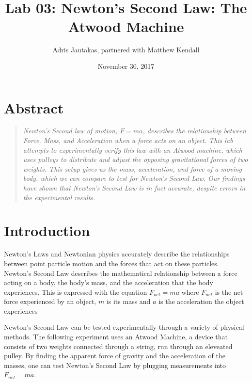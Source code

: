 \documentclass[12pt]{article}
\title{Lab 03: Newton's Second Law: The Atwood Machine}
\author{Adris Jautakas, partnered with Matthew Kendall}
\date{November 30, 2017}
\begin{document}
   \maketitle

    \pagebreak

    \section*{Abstract}
        \begin{quote}
        {\textit {\small 
            Newton's Second law of motion, $F = ma$, describes the relationship
            between Force, Mass, and Acceleration when a force acts on an
            object. This lab attempts to experimentally verify this law with
            an Atwood machine, which uses pulleys to distribute and adjust 
            the opposing gravitational forces of two weights. This setup
            gives us the mass, acceleration, and force of a moving body,
            which we can compare to test for Newton's Second Law. Our
            findings have shown that Newton's Second Law is in fact
            accurate, despite errors in the experimental results.
        } }
        \end{quote}
    \section{Introduction}
        \par Newton's Laws and Newtonian physics accurately describe the 
        relationships between point particle motion and the forces
        that act on these particles.
        Newton's Second Law describes the mathematical relationship 
        between a force acting on a body, the body's mass, and the
        acceleration that the body experiences. This is expressed with
        the equation $F_{net} = ma$ where $F_{net}$ is the net force experienced
        by an object, $m$ is its mass and $a$ is the acceleration the object
        experiences
        \par Newton's Second Law can be tested experimentally through a variety
        of physical methods. The following experiment uses an Atwood Machine,
        a device that consists of two weights connected through a string, run
        through an eleveated pulley. By finding the apparent force of gravity
        and the acceleration of the masses, one can test Newton's Second Law
        by plugging measurements into $F_{net} = ma$.

\end{document}
